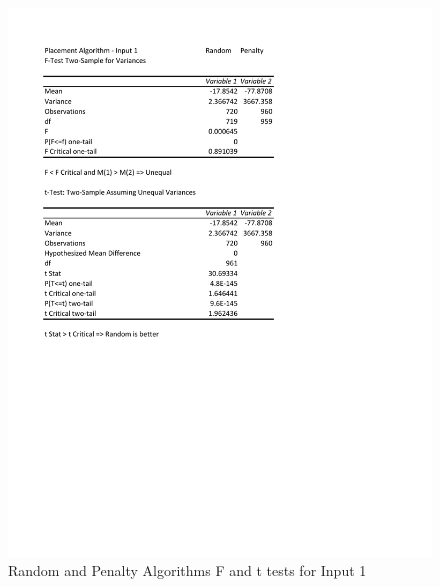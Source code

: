 \documentclass[times]{article}
\begin{document}
	\begin{figure}
		\caption{Random and Penalty Algorithms F and t tests for Input 1}
		\label{fig:random_penalty1}
		\includegraphics[width=\textwidth]{./t_test/Random_Penalty1}
	\end{figure}
\end{document}
